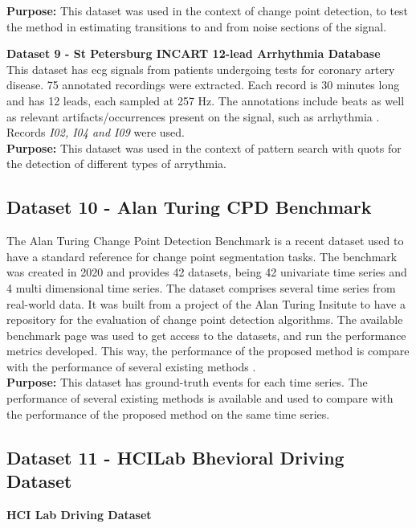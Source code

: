 \textbf{Purpose:} This dataset was used in the context of change point detection, to test the method in estimating transitions to and from noise sections of the signal.

\textbf{Dataset 9 - St Petersburg INCART 12-lead Arrhythmia Database}\\

This dataset has \gls{ecg} signals from patients undergoing tests for coronary artery disease. 75 annotated recordings were extracted. Each record is 30 minutes long and has 12 leads, each sampled at 257 Hz. The annotations include beats as well as relevant artifacts/occurrences present on the signal, such as arrhythmia \cite{PhysioNet}. Records \textit{I02, I04 and I09} were used.\\
\textbf{Purpose:} This dataset was used in the context of pattern search with \gls{quots} for the detection of different types of arrythmia.


\subsection{Dataset 10 - Alan Turing CPD Benchmark}
\label{sec:dataset8}

The Alan Turing Change Point Detection Benchmark is a recent dataset used to have a standard reference for change point segmentation tasks. The benchmark was created in 2020 and provides 42 datasets, being 42 univariate time series and 4 multi dimensional time series. The dataset comprises several time series from real-world data. It was built from a project of the Alan Turing Insitute to have a repository for the evaluation of change point detection algorithms. The available benchmark page was used to get access to the datasets, and run the performance metrics developed. This way, the performance of the proposed method is compare with the performance of several existing methods \cite{cpd_alan}.\\

\textbf{Purpose:} This dataset has ground-truth events for each time series. The performance of several existing methods is available and used to compare with the performance of the proposed method on the same time series.

\subsection{Dataset 11 - HCILab Bhevioral Driving Dataset}

\textbf{HCI Lab Driving Dataset}\\

